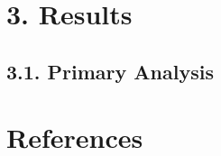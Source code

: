 \documentclass[man,floatsintext]{apa6}
\begin{document}
\hypertarget{results}{%
\section{3. Results}\label{results}}

\hypertarget{primary-analysis}{%
\subsection{3.1. Primary Analysis}\label{primary-analysis}}



\newpage

\hypertarget{references}{%
\section{References}\label{references}}

\begingroup
\setlength{\parindent}{-0.5in}
\setlength{\leftskip}{0.5in}

\hypertarget{refs}{}

\endgroup
\end{document}

